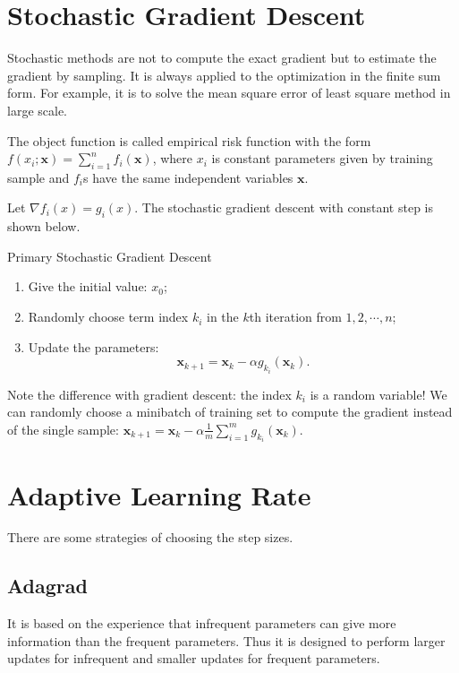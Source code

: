 \documentclass[11pt]{article} %
\begin{document}
\begin{algorithm}[htb]
\section{Stochastic Gradient Descent}

Stochastic methods are not to compute the exact gradient but to estimate the gradient by sampling.
It is always applied to the optimization in the finite sum form. For example, it is to solve the mean square error of least square method in large scale.

The object function is called empirical risk function with the
form $f(x_i;\textbf{x})=\sum_{i=1}^{n}f_{i}(\textbf{x})$, where $x_i$ is constant parameters given by training sample and $f_{i}$s have the same independent variables $\textbf{x}$.

Let $\nabla f_{i}(x) = g_{i}(x)$. The stochastic gradient descent with constant step is shown below.
\begin{algorithm}[htb]
\caption{Primary Stochastic Gradient Descent}
\label{SGD}
\begin{enumerate}
  \item Give the initial value: $x_0$;
  \item Randomly choose term index $k_{i}$ in the $k$th iteration from ${1,2,\cdots, n}$;
  \item Update the parameters: $${\textbf{x}}_{k+1}={\textbf{x}}_{k} - \alpha g_{k_{i}}({\textbf{x}}_{k}).$$
\end{enumerate}
\end{algorithm}

Note the difference with gradient descent: the index $k_{i}$ is a random variable!
We can randomly choose a minibatch of training set to compute the gradient instead of the single sample:
${\textbf{x}}_{k+1}={\textbf{x}}_{k} - \alpha \frac{1}{m}\sum_{i=1}^{m}g_{k_{i}}({\textbf{x}}_{k})$.


\section{Adaptive Learning Rate}

There are some strategies of choosing the step sizes.

\subsection{Adagrad}
It is based on the experience that infrequent parameters can give more information than the frequent parameters.
Thus it is designed to perform larger updates for infrequent and smaller updates for frequent parameters.


\end{algorithm}
\end{document}
